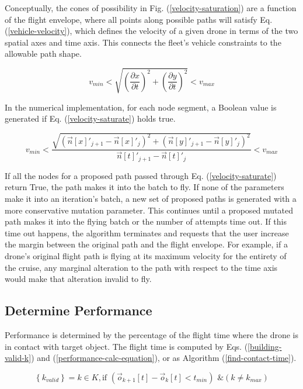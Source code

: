 \documentclass[conf]{new-aiaa}
\begin{document}
Conceptually, the cones of possibility in Fig. (\ref{velocity-saturation}) are a function of the flight envelope, where all points along possible paths will satisfy Eq. (\ref{vehicle-velocity}), which defines the velocity of a given drone in terms of the two spatial axes and time axis. This connects the fleet's vehicle constraints to the allowable path shape.

\begin{equation}
\label{vehicle-velocity}
v_{min} < \sqrt{\left(\frac{\partial{x}}{\partial{t}}\right)^2 + \left(\frac{\partial{y}}{\partial{t}}\right)^2} < v_{max}
\end{equation}

In the numerical implementation, for each node segment, a Boolean value is generated if Eq. (\ref{velocity-saturate}) holds true.

\begin{equation}
\label{velocity-saturate}
v_{min} < \frac{\sqrt{\left(\vec{n}[x]'_{j + 1} - \vec{n}[x]'_{j}\right)^2 + \left(\vec{n}[y]'_{j + 1} - \vec{n}[y]'_{j}\right)^2}}{\vec{n}[t]'_{j + 1} - \vec{n}[t]'_{j}} < v_{max}
\end{equation}

If all the nodes for a proposed path passed through Eq. (\ref{velocity-saturate}) return True, the path makes it into the batch to fly. If none of the parameters make it into an iteration's batch, a new set of proposed paths is generated with a more conservative mutation parameter. This continues until a proposed mutated path makes it into the flying batch or the number of attempts time out. If this time out happens, the algorithm terminates and requests that the user increase the margin between the original path and the flight envelope. For example, if a drone's original flight path is flying at its maximum velocity for the entirety of the cruise, any marginal alteration to the path with respect to the time axis would make that alteration invalid to fly.

\subsection{Determine Performance}
Performance is determined by the percentage of the flight time where the drone is in contact with target object. The flight time is computed by Eqs. (\ref{building-valid-k}) and (\ref{performance-calc-equation}), or as Algorithm (\ref{find-contact-time}).

\begin{equation}
\label{building-valid-k}
\left\{k_{valid}\right\} = k \in K, \text{if } \left(\vec{o}_{k + 1}[t] - \vec{o}_k[t] < t_{min}\right) \text{ \& } \left(k \neq k_{max}\right)
\end{equation}
\end{document}
